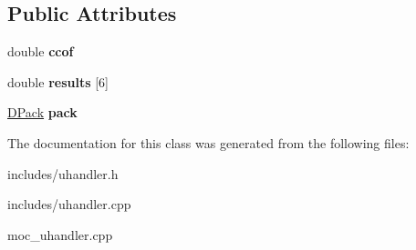 \subsection*{Public Attributes}
\begin{DoxyCompactItemize}
\item 
\hypertarget{class_u_handler_aa7a1e60cd01885933bec8834ae3ae4e9}{
double {\bfseries ccof}}
\label{class_u_handler_aa7a1e60cd01885933bec8834ae3ae4e9}

\item 
\hypertarget{class_u_handler_ac89d9da8baa7fa903204e6a67d3a80bd}{
double {\bfseries results} \mbox{[}6\mbox{]}}
\label{class_u_handler_ac89d9da8baa7fa903204e6a67d3a80bd}

\item 
\hypertarget{class_u_handler_adce63833fe7060d728105361fec2d42f}{
\hyperlink{struct_d_pack}{DPack} {\bfseries pack}}
\label{class_u_handler_adce63833fe7060d728105361fec2d42f}

\end{DoxyCompactItemize}


The documentation for this class was generated from the following files:\begin{DoxyCompactItemize}
\item 
includes/uhandler.h\item 
includes/uhandler.cpp\item 
moc\_\-uhandler.cpp\end{DoxyCompactItemize}
